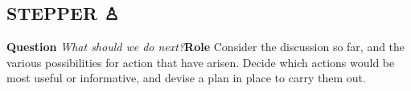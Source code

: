\subsection*{STEPPER {\chess ♙} {\hfill \motor}}

\textbf{Question} \emph{What should we do next?}\newline \textbf{Role}
Consider the discussion so far, and the various possibilities for
action that have arisen.  Decide which actions would be most useful or
informative, and devise a plan in place to carry them out.\newline
